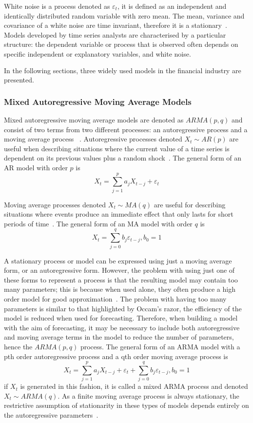 \documentclass[13pt]{report}
\begin{document}
White noise is a process denoted as $\varepsilon_{t}$, it is defined as an independent and identically distributed random variable with zero mean. The mean, variance and covariance of a white noise are time invariant, therefore it is a stationary~\cite{processsheppard2013financial}. Models developed by time series analysts are characterised by a particular structure: the dependent variable or process that is observed often depends on specific independent or explanatory variables, and white noise.

In the following sections, three widely used models in the financial industry are presented.

\subsubsection{Mixed Autoregressive Moving Average Models}
Mixed autoregressive moving average models are denoted as $ARMA(p,q)$ and consist of two terms from two different processes: an autoregressive process and a moving average process ~\cite{parametershamilton1994time}. Autoregressive processes denoted $X_{t}\sim AR(p)$ are useful when describing situations where the current value of a time series is dependent on its previous values plus a random shock~\cite{wei1994time}. The general form of an AR model with order $p$ is \[X_{t}=\sum_{j=1}^{p}a_{j}X_{t-j}+\varepsilon_{t}\]\par

Moving average processes denoted $X_{t}\sim MA(q)$  are useful for describing situations where events produce an immediate effect that only lasts for short periods of time~\cite{wei1994time}. The general form of an MA model with order $q$ is \[X_{t}=\sum_{j=0}^{q}b_{j}\varepsilon_{t-j}, b_{0}=1\]\par

A stationary process or model can be expressed using just a moving average form, or an autoregressive form. However, the problem with using just one of these forms to represent a process is that the resulting model may contain too many parameters; this is because when used alone, they often produce a high order model for good approximation~\cite{wei1994time}. The problem with having too many parameters is similar to that highlighted by Occam's razor, the efficiency of the model is reduced when used for forecasting. Therefore, when building a model with the aim of forecasting, it may be necessary to include both autoregressive and moving average terms in the model to reduce the number of parameters, hence the $ARMA(p,q)$ process. The general form of an ARMA model with a pth order autoregressive process and a qth order moving average process is \[X_{t}=\sum_{j=1}^{p}a_{j}X_{t-j}+\varepsilon_{t}+ \sum_{j=0}^{q}b_{j}\varepsilon_{t-j}, b_{0}=1\] if $X_{t}$ is generated in this fashion, it is called a mixed ARMA process and denoted $X_{t}\sim ARMA(q)$. As a finite moving average process is always stationary, the restrictive assumption of stationarity in these types of models depends entirely on the autoregressive parameters~\cite{parametershamilton1994time}.\par
\end{document}

